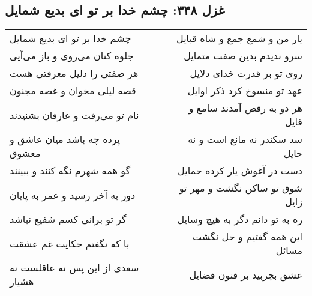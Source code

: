\begin{center}
\section*{غزل ۳۴۸: چشم خدا بر تو ای بدیع شمایل}
\label{sec:348}
\begin{longtable}{l p{0.5cm} r}
چشم خدا بر تو ای بدیع شمایل
&&
یار من و شمع جمع و شاه قبایل
\\
جلوه کنان می‌روی و باز می‌آیی
&&
سرو ندیدم بدین صفت متمایل
\\
هر صفتی را دلیل معرفتی هست
&&
روی تو بر قدرت خدای دلایل
\\
قصه لیلی مخوان و غصه مجنون
&&
عهد تو منسوخ کرد ذکر اوایل
\\
نام تو می‌رفت و عارفان بشنیدند
&&
هر دو به رقص آمدند سامع و قایل
\\
پرده چه باشد میان عاشق و معشوق
&&
سد سکندر نه مانع است و نه حایل
\\
گو همه شهرم نگه کنند و ببینند
&&
دست در آغوش یار کرده حمایل
\\
دور به آخر رسید و عمر به پایان
&&
شوق تو ساکن نگشت و مهر تو زایل
\\
گر تو برانی کسم شفیع نباشد
&&
ره به تو دانم دگر به هیچ وسایل
\\
با که نگفتم حکایت غم عشقت
&&
این همه گفتیم و حل نگشت مسائل
\\
سعدی از این پس نه عاقلست نه هشیار
&&
عشق بچربید بر فنون فضایل
\\
\end{longtable}
\end{center}
